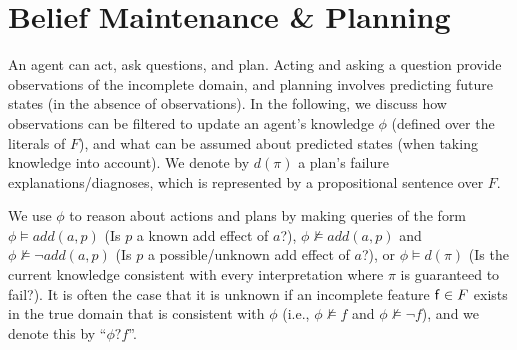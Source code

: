 \documentclass{article}
\begin{document}
\section{Belief Maintenance \& Planning}

An agent can act, ask questions, and plan.  Acting and asking a question provide
observations of the incomplete domain, and planning involves predicting future
states (in the absence of observations).  In the following, we discuss how
observations can be filtered to update an agent's knowledge $\phi$ (defined over
the literals of $F$), and what can be assumed about predicted states
(when taking knowledge into account).  We denote by $d(\pi)$ a plan's failure
explanations/diagnoses, which is represented by a propositional sentence over
$F$.

We use $\phi$ to reason about actions and
plans by making queries of the form $\phi \models
add({a}, p)$ (Is $p$ a known add effect of
${a}$?), $\phi \not\models add({a}, p)$ and $\phi
\not \models \neg add({a}, p)$  (Is $p$ a
possible/unknown add effect of ${a}$?),  or $\phi \models d(\pi)$ (Is the
current knowledge consistent with every interpretation where $\pi$ is guaranteed
to fail?).  It is often the case that it is unknown if an incomplete feature
${\sf f} \in F$ exists in the true domain that is consistent with $\phi$ (i.e., $\phi \not\models f$ and $\phi \not\models
\neg f$), and we denote this by ``$\phi?f$''.
\end{document}
